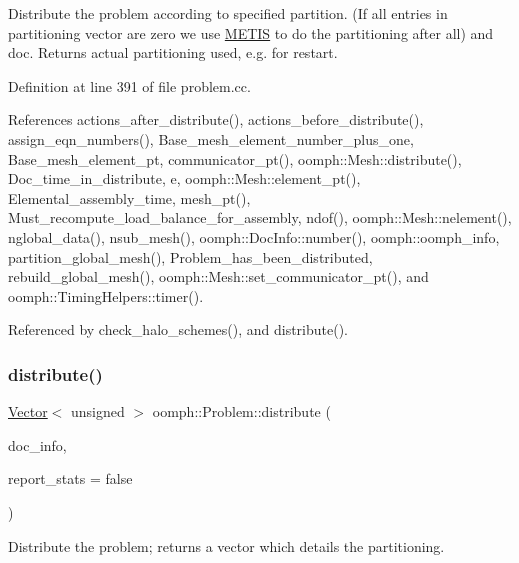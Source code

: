 Distribute the problem according to specified partition. (If all entries in partitioning vector are zero we use \hyperlink{namespaceoomph_1_1METIS}{M\+E\+T\+IS} to do the partitioning after all) and doc. Returns actual partitioning used, e.\+g. for restart. 

Definition at line 391 of file problem.\+cc.



References actions\+\_\+after\+\_\+distribute(), actions\+\_\+before\+\_\+distribute(), assign\+\_\+eqn\+\_\+numbers(), Base\+\_\+mesh\+\_\+element\+\_\+number\+\_\+plus\+\_\+one, Base\+\_\+mesh\+\_\+element\+\_\+pt, communicator\+\_\+pt(), oomph\+::\+Mesh\+::distribute(), Doc\+\_\+time\+\_\+in\+\_\+distribute, e, oomph\+::\+Mesh\+::element\+\_\+pt(), Elemental\+\_\+assembly\+\_\+time, mesh\+\_\+pt(), Must\+\_\+recompute\+\_\+load\+\_\+balance\+\_\+for\+\_\+assembly, ndof(), oomph\+::\+Mesh\+::nelement(), nglobal\+\_\+data(), nsub\+\_\+mesh(), oomph\+::\+Doc\+Info\+::number(), oomph\+::oomph\+\_\+info, partition\+\_\+global\+\_\+mesh(), Problem\+\_\+has\+\_\+been\+\_\+distributed, rebuild\+\_\+global\+\_\+mesh(), oomph\+::\+Mesh\+::set\+\_\+communicator\+\_\+pt(), and oomph\+::\+Timing\+Helpers\+::timer().



Referenced by check\+\_\+halo\+\_\+schemes(), and distribute().

\mbox{\label{classoomph_1_1Problem_a9bab7c41bf5d6d053259ff10920d7303}} 
\subsubsection{\texorpdfstring{distribute()}{distribute()}\hspace{0.1cm}{\footnotesize\ttfamily [2/4]}}
{\footnotesize\ttfamily \hyperlink{classoomph_1_1Vector}{Vector}$<$ unsigned $>$ oomph\+::\+Problem\+::distribute (\begin{DoxyParamCaption}\item[{\hyperlink{classoomph_1_1DocInfo}{Doc\+Info} \&}]{doc\+\_\+info,  }\item[{const bool \&}]{report\+\_\+stats = {\ttfamily false} }\end{DoxyParamCaption})}



Distribute the problem; returns a vector which details the partitioning. 


